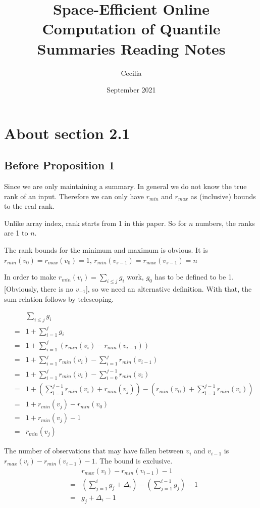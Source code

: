 \documentclass{article}
\title{Space-Efficient Online Computation of Quantile Summaries Reading Notes}
\author{Cecilia}
\date{September 2021}
\begin{document}
\maketitle
\section*{About section 2.1}
\subsection*{Before Proposition 1}
Since we are only maintaining a summary. In general we do not know the true rank of an input. Therefore we can only have $ r_{min} $ and $ r_{max} $ as (inclusive) bounds to the real rank.

Unlike array index, rank starts from 1 in this paper. So for $ n $ numbers, the ranks are 1 to $ n $.

The rank bounds for the minimum and maximum is obvious. It is $ r_{min}(v_0) = r_{max}(v_0)= 1 $, $ r_{min}(v_{s-1}) = r_{max}(v_{s-1})= n $

In order to make $ r_{min}(v_i) = \sum\limits_{i \le j}g_i $ work, $ g_0 $ has to be defined to be 1. [Obviously, there is no $ v_{-1} $], so we need an alternative definition. With that, the sum relation follows by telescoping.

\begin{eqnarray*}
  & & \sum\limits_{i \le j}g_i \\
  &=& 1 + \sum\limits_{i=1}^{j}g_i \\
  &=& 1 + \sum\limits_{i=1}^{j}{\left(r_{min}(v_i) -r_{min}(v_{i-1})\right)} \\
  &=& 1 + \sum\limits_{i=1}^{j}{r_{min}(v_i)} - \sum\limits_{i=1}^{j}{r_{min}(v_{i-1})} \\
  &=& 1 + \sum\limits_{i=1}^{j}{r_{min}(v_i)} - \sum\limits_{i=0}^{j-1}{r_{min}(v_{i})} \\
  &=& 1 + \left(\sum\limits_{i=1}^{j-1}{r_{min}(v_i)} + r_{min}(v_j)\right) - \left(r_{min}(v_0) + \sum\limits_{i=1}^{j-1}{r_{min}(v_i)}\right) \\
  &=& 1 + r_{min}(v_j) - r_{min}(v_0) \\
  &=& 1 + r_{min}(v_j) - 1 \\
  &=& r_{min}(v_j)
\end{eqnarray*}

The number of observations that may have fallen between $ v_i $ and $ v_{i-1} $ is $ r_{max}(v_i) - r_{min}(v_{i-1}) - 1 $. The bound is exclusive.
\begin{eqnarray*}
  & & r_{max}(v_i) - r_{min}(v_{i-1}) - 1 \\
  &=& \left(\sum\limits_{j=1}^{i}g_j + \Delta_i\right) - \left(\sum\limits_{j=1}^{i-1}g_j\right) - 1\\
  &=& g_j + \Delta_i - 1
\end{eqnarray*}
\end{document}
